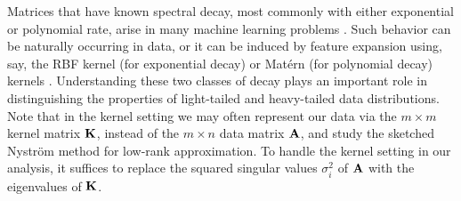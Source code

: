 \documentclass[../../thesis.tex]{subfiles}
\begin{document}
Matrices that have known spectral decay, most commonly with either
exponential or polynomial rate, arise in many machine
learning problems \citep{randomized-newton}. Such behavior can be naturally
occurring in data, or it can be induced by feature expansion using, say, the
RBF kernel (for exponential decay) or
Mat\'ern (for polynomial decay) kernels \citep{Santa97gaussianregression,RasmussenWilliams06}. Understanding these
two classes of decay plays an important role in distinguishing the
properties of light-tailed and heavy-tailed data distributions.
Note that in the kernel setting we may often represent our data via
the $m\times m$ kernel matrix $\mathbf K$, instead of the $m\times n$ data
matrix $\mathbf A$, and study the sketched Nystr\"om method
\citep{revisiting-nystrom} for low-rank approximation. To handle
the kernel setting in our analysis, it suffices to replace the squared singular
values $\sigma_i^2$ of $\mathbf A$ with the eigenvalues of $\mathbf K$.
\end{document}
